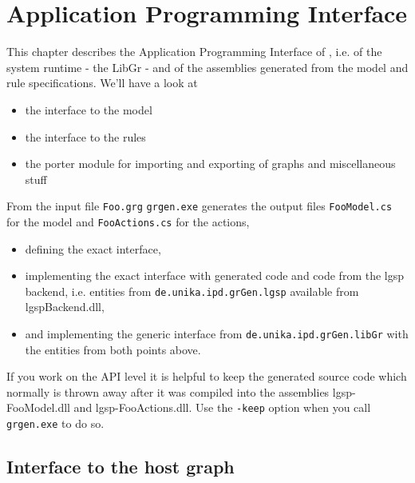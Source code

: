 \chapter{Application Programming Interface} 
\label{cha:api}

This chapter describes the Application Programming Interface of \GrG, i.e. of the system runtime - the LibGr - and of the assemblies generated from the model and rule specifications.
We'll have a look at
\begin{itemize}
\item the interface to the model
\item the interface to the rules
\item the porter module for importing and exporting of graphs and miscellaneous stuff
\end{itemize}

From the input file \texttt{Foo.grg} \texttt{grgen.exe} generates the output files \texttt{FooModel.cs} for the model and \texttt{FooActions.cs} for the actions,
\begin{itemize}
\item defining the exact interface, 
\item implementing the exact interface with generated code and code from the lgsp backend, i.e. entities from \texttt{de.unika.ipd.grGen.lgsp} available from lgspBackend.dll, 
\item and implementing the generic interface from \texttt{de.unika.ipd.grGen.libGr} with the entities from both points above.
\end{itemize}

\begin{note}
If you work on the API level it is helpful to keep the generated source code which normally is thrown away 
after it was compiled into the assemblies lgsp-FooModel.dll and lgsp-FooActions.dll.
Use the \texttt{-keep} option when you call \texttt{grgen.exe} to do so.
\end{note}

\section{Interface to the host graph}

